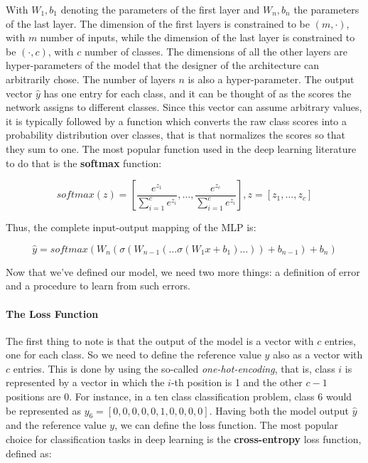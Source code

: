 \documentclass[../main.tex]{subfiles}
\begin{document}
    With $W_{1}, b_{1}$ denoting the parameters of the first layer and $W_{n}, b_{n}$ the parameters of the last layer. The dimension of the
    first layers is constrained to be $(m, \cdot)$, with $m$ number of inputs, while the dimension of the last layer is constrained to be
    $(\cdot, c)$, with $c$ number of classes. The dimensions of all the other layers are hyper-parameters of the model that the designer
    of the architecture can arbitrarily chose. The number of layers $n$ is also a hyper-parameter.
    \newline
    The output vector $\hat{y}$ has one entry for each class, and it can be thought of as the scores the network assigns to different classes.
    Since this vector can assume arbitrary values, it is typically followed by a function which converts the raw class scores into a
    probability distribution over classes, that is that normalizes the scores so that they sum to one.
    The most popular function used in the deep learning literature to do that is the \textbf{softmax} function:

    \begin{equation}
        softmax(z) = \left[ \frac{e^{z_{1}}}{\sum_{i = 1}^{c} e^{z_{i}}} , \ldots , \frac{e^{z_{c}}}{\sum_{i = 1}^{c} e^{z_{i}}} \right], z = \left[ z_{1}, \ldots ,z_{c}  \right]
    \end{equation}

    Thus, the complete input-output mapping of the MLP is:

    \begin{equation} \label{eq:MLPequation}
        \hat{y} = softmax(W_{n}(\sigma(W_{n-1}(\ldots \sigma(W_{1} x + b_{1}) \ldots)) + b_{n-1}) + b_{n})
    \end{equation}

    Now that we've defined our model, we need two more things: a definition of error and a procedure to learn from such errors.

    \paragraph{The Loss Function}
    The first thing to note is that the output of the model is a vector with $c$ entries, one for each class. So we need to define the
    reference value $y$ also as a vector with $c$ entries. This is done by using the so-called \textit{one-hot-encoding}, that is, class
    $i$ is represented by a vector in which the $i$-th position is 1 and the other $c - 1$ positions are 0. For instance, in a ten class
    classification problem, class 6 would be represented as $y_{6} = \left[ 0, 0, 0, 0, 0, 1, 0, 0, 0, 0 \right] $. Having both
    the model output $\hat{y}$ and the reference value $y$, we can define the loss function. The most popular choice for classification
    tasks in deep learning is the \textbf{cross-entropy} loss function, defined as:
\end{document}
